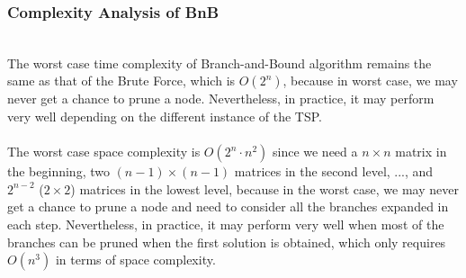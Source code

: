 \subsubsection{Complexity Analysis of BnB}
\hfill\\
The worst case time complexity of Branch-and-Bound algorithm remains the same as that of the Brute Force, which is $O(2^n)$, because in worst case, we may never get a chance to prune a node. Nevertheless, in practice, it may perform very well depending on the different instance of the TSP.\\
\\
The worst case space complexity is $O(2^n\cdot n^2)$ since we need a $n\times n$ matrix in the beginning, two $(n-1)\times (n-1)$ matrices in the second level, ..., and $2^{n-2}$ ($2\times 2$) matrices in the lowest level, because in the worst case, we may never get a chance to prune a node and need to consider all the branches expanded in each step. Nevertheless, in practice, it may perform very well when most of the branches can be pruned when the first solution is obtained, which only requires $O(n^3)$ in terms of space complexity.
